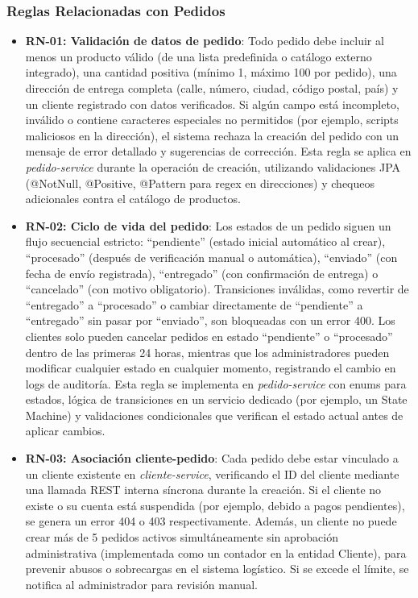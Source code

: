 \documentclass[a4paper,12pt]{article}
\begin{document}
\subsubsection{Reglas Relacionadas con Pedidos}
\begin{itemize}
    \item \textbf{RN-01: Validación de datos de pedido}: Todo pedido debe incluir al menos un producto válido (de una lista predefinida o catálogo externo integrado), una cantidad positiva (mínimo 1, máximo 100 por pedido), una dirección de entrega completa (calle, número, ciudad, código postal, país) y un cliente registrado con datos verificados. Si algún campo está incompleto, inválido o contiene caracteres especiales no permitidos (por ejemplo, scripts maliciosos en la dirección), el sistema rechaza la creación del pedido con un mensaje de error detallado y sugerencias de corrección. Esta regla se aplica en \textit{pedido-service} durante la operación de creación, utilizando validaciones JPA (@NotNull, @Positive, @Pattern para regex en direcciones) y chequeos adicionales contra el catálogo de productos.
    
    \item \textbf{RN-02: Ciclo de vida del pedido}: Los estados de un pedido siguen un flujo secuencial estricto: ``pendiente'' (estado inicial automático al crear), ``procesado'' (después de verificación manual o automática), ``enviado'' (con fecha de envío registrada), ``entregado'' (con confirmación de entrega) o ``cancelado'' (con motivo obligatorio). Transiciones inválidas, como revertir de ``entregado'' a ``procesado'' o cambiar directamente de ``pendiente'' a ``entregado'' sin pasar por ``enviado'', son bloqueadas con un error 400. Los clientes solo pueden cancelar pedidos en estado ``pendiente'' o ``procesado'' dentro de las primeras 24 horas, mientras que los administradores pueden modificar cualquier estado en cualquier momento, registrando el cambio en logs de auditoría. Esta regla se implementa en \textit{pedido-service} con enums para estados, lógica de transiciones en un servicio dedicado (por ejemplo, un State Machine) y validaciones condicionales que verifican el estado actual antes de aplicar cambios.
    
    \item \textbf{RN-03: Asociación cliente-pedido}: Cada pedido debe estar vinculado a un cliente existente en \textit{cliente-service}, verificando el ID del cliente mediante una llamada REST interna síncrona durante la creación. Si el cliente no existe o su cuenta está suspendida (por ejemplo, debido a pagos pendientes), se genera un error 404 o 403 respectivamente. Además, un cliente no puede crear más de 5 pedidos activos simultáneamente sin aprobación administrativa (implementada como un contador en la entidad Cliente), para prevenir abusos o sobrecargas en el sistema logístico. Si se excede el límite, se notifica al administrador para revisión manual.
    

\end{itemize}
\end{document}
